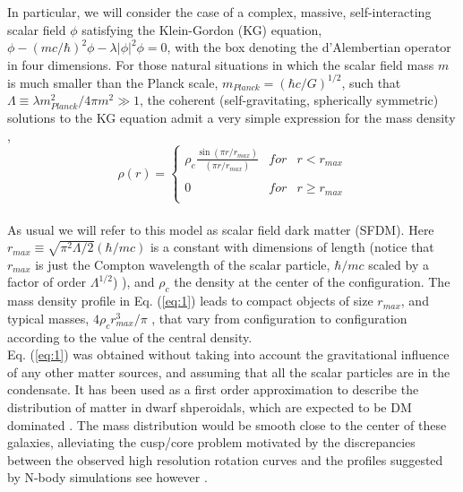 \documentclass[8pt,letterpaper,twocolumn]{article}
\begin{document}
In particular, we will consider the case of a complex, massive, self-interacting scalar field $\phi$ satisfying the Klein-Gordon (KG) equation, $\phi - (mc/ \hbar)^2 \phi - \lambda |\phi|^2 \phi = 0$, with the box denoting the d’Alembertian operator in four dimensions. For those natural situations in which the scalar field mass $m$ is much smaller than the Planck scale, $m_{Planck} = (\hbar c/ G)^{1/2}$, such that $\Lambda \equiv \lambda m_{Planck}^2 /4 \pi m^2 \gg 1$, the coherent (self-gravitating, spherically symmetric) solutions to the KG equation admit a very simple expression for the mass density \cite{PhysRevLett.57.2485,PhysRevD.68.023511}, 
\begin{equation} \label{eq:1}
\rho(r)= \left\{\begin{array}{ccc}
             \rho_c \frac{\sin(\pi r/ r_{max})}{(\pi r/ r_{max})} & for & r < r_{max} \\
             \\ 0 & for & r \geq r_{max} \\
             \end{array}
   \right.
\end{equation}
\\
As usual we will refer to this model as scalar field dark matter (SFDM). Here $r_{max} \equiv \sqrt{\pi^2 \Lambda/2}(\hbar / mc)$ is a constant with dimensions of length (notice that $r_{max} $ is just the Compton wavelength of the scalar particle, $\hbar/mc$ scaled by a factor of order $\Lambda^{1/2}$)
), and $\rho_c$ the density at the center of the configuration. The mass density profile in Eq. (\ref{eq:1}) leads to compact objects of size $r_{max}$, and typical masses, $4 \rho_c r^3_{max}/\pi$ , that vary from configuration to configuration according to the value of the central density.\\

Eq. (\ref{eq:1}) was obtained without taking into account the gravitational influence of any other matter sources, and assuming that all the scalar particles are in the condensate. It has been used as a first order approximation to describe the distribution of matter in dwarf shperoidals, which are expected to be DM dominated \cite{PhysRevD.68.023511, Harko_2011,10.1111/j.1365-2966.2012.20603.x}  . The mass distribution would be smooth close to the center of these galaxies, alleviating the cusp/core problem motivated by the discrepancies between the observed high resolution rotation curves and the profiles suggested by N-body simulations \cite{de_Blok_2002} see however \cite{Valenzuela_2007}.\\
\end{document}
